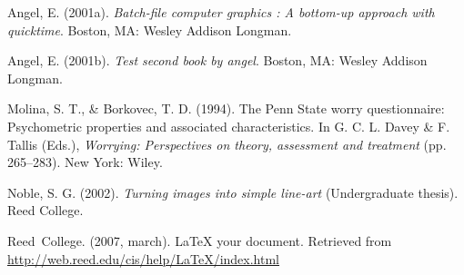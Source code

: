 \documentclass[12pt,twoside]{reedthesis}
\begin{document}
  \hypertarget{ref-angel2001}{}
  Angel, E. (2001a). \emph{Batch-file computer graphics : A bottom-up
  approach with quicktime}. Boston, MA: Wesley Addison Longman.
  
  \hypertarget{ref-angel2002a}{}
  Angel, E. (2001b). \emph{Test second book by angel}. Boston, MA: Wesley
  Addison Longman.
  
  \hypertarget{ref-Molina1994}{}
  Molina, S. T., \& Borkovec, T. D. (1994). The Penn State worry
  questionnaire: Psychometric properties and associated characteristics.
  In G. C. L. Davey \& F. Tallis (Eds.), \emph{Worrying: Perspectives on
  theory, assessment and treatment} (pp. 265--283). New York: Wiley.
  
  \hypertarget{ref-noble2002}{}
  Noble, S. G. (2002). \emph{Turning images into simple line-art}
  (Undergraduate thesis). Reed College.
  
  \hypertarget{ref-reedweb2007}{}
  Reed~College. (2007, march). LaTeX your document. Retrieved from
  \url{http://web.reed.edu/cis/help/LaTeX/index.html}


\end{document}
